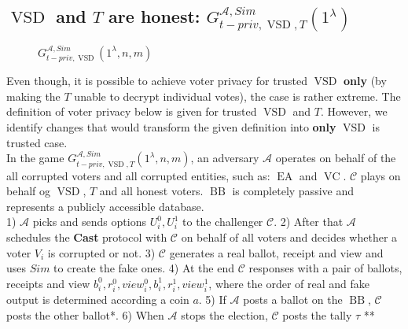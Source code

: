 \documentclass[12pt]{article}
\DeclareMathOperator{\vsd}{VSD}
\DeclareMathOperator{\ea}{EA}
\DeclareMathOperator{\bb}{BB}
\DeclareMathOperator{\voc}{VC}
\begin{document}
\subsection{$\vsd$ and $T$ are honest: $G_{t-priv,\vsd,T}^{\mathcal{A},Sim}(1^{\lambda})$}
     \begin{figure}[h!]
 
        \caption{ $G_{t-priv,\vsd}^{\mathcal{A},Sim}(1^{\lambda},n,m)$}
\end{figure}
Even though, it is possible to achieve voter privacy for trusted $\vsd$ \textbf{only}  (by making the $T$ unable to decrypt individual votes), the case is rather extreme. The definition of voter privacy below is given for trusted $\vsd$ and $T$. However, we identify changes that would transform the given definition into \textbf{only} $\vsd$ is trusted case.\\

 In the game $G_{t-priv,\vsd,T}^{\mathcal{A}, Sim}(1^{\lambda},n,m)$, an adversary $\mathcal{A}$  operates on behalf of the all corrupted voters and all corrupted entities, such as:  $\ea$ and $\voc$.  $\mathcal{C}$ plays on behalf og $\vsd$, $T$ and all honest voters. $\bb$ is completely passive and represents a publicly accessible database.\\
 
 1)  $\mathcal{A}$ picks and sends options $U_i^0, U_i^1$ to the challenger $\mathcal{C}$. 2) After that $\mathcal{A}$ schedules the \textbf{Cast} protocol with $\mathcal{C}$ on behalf of all voters and decides whether a voter $V_i$ is corrupted or not. 3) $\mathcal{C}$ generates a real ballot, receipt and view and uses $Sim$ to create the fake ones.  4) At the end $\mathcal{C}$ responses with a pair of ballots, receipts and view $b_i^0,r_i^0,view_i^0,b_i^1,r_i^1,view_i^1$, where the order of real and fake output is determined according a coin $a$. 5) If $\mathcal{A}$ posts a ballot on the $\bb$, $\mathcal{C}$ posts the other ballot*. 6)  When $\mathcal{A}$ stops the election, $\mathcal{C}$ posts the tally $\tau$ ** \\
\end{document}
